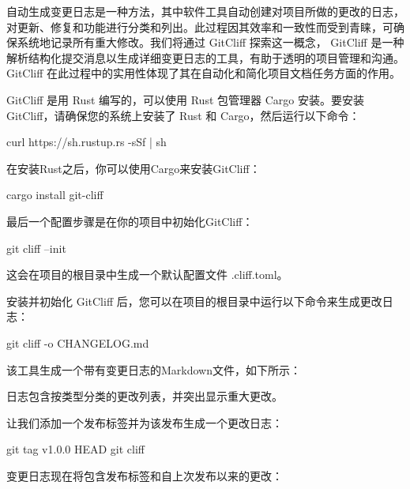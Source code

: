 
自动生成变更日志是一种方法，其中软件工具自动创建对项目所做的更改的日志，对更新、修复和功能进行分类和列出。此过程因其效率和一致性而受到青睐，可确保系统地记录所有重大修改。我们将通过 GitCliff 探索这一概念， GitCliff 是一种解析结构化提交消息以生成详细变更日志的工具，有助于透明的项目管理和沟通。 GitCliff 在此过程中的实用性体现了其在自动化和简化项目文档任务方面的作用。


GitCliff 是用 Rust 编写的，可以使用 Rust 包管理器 Cargo 安装。要安装 GitCliff，请确保您的系统上安装了 Rust 和 Cargo，然后运行以下命令：

\begin{shell}
curl https://sh.rustup.rs -sSf | sh
\end{shell}

在安装Rust之后，你可以使用Cargo来安装GitCliff：

\begin{shell}
cargo install git-cliff
\end{shell}

最后一个配置步骤是在你的项目中初始化GitCliff：

\begin{shell}
git cliff --init
\end{shell}

这会在项目的根目录中生成一个默认配置文件 .cliff.toml。


安装并初始化 GitCliff 后，您可以在项目的根目录中运行以下命令来生成更改日志：

\begin{shell}
git cliff -o CHANGELOG.md
\end{shell}

该工具生成一个带有变更日志的Markdown文件，如下所示：


日志包含按类型分类的更改列表，并突出显示重大更改。

让我们添加一个发布标签并为该发布生成一个更改日志：

\begin{shell}
git tag v1.0.0 HEAD
git cliff
\end{shell}

变更日志现在将包含发布标签和自上次发布以来的更改：



